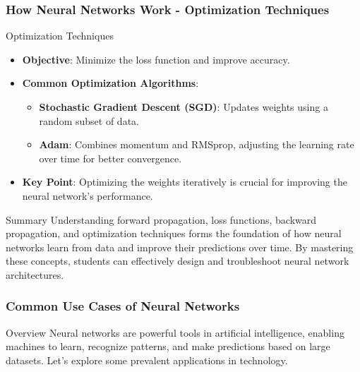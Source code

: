\documentclass[aspectratio=169]{beamer}
\begin{document}
\begin{frame}[fragile]
    \frametitle{How Neural Networks Work - Optimization Techniques}
    \begin{block}{Optimization Techniques}
        \begin{itemize}
            \item \textbf{Objective}: Minimize the loss function and improve accuracy.
            
            \item \textbf{Common Optimization Algorithms}:
            \begin{itemize}
                \item \textbf{Stochastic Gradient Descent (SGD)}: Updates weights using a random subset of data.
                \item \textbf{Adam}: Combines momentum and RMSprop, adjusting the learning rate over time for better convergence.
            \end{itemize}
            
            \item \textbf{Key Point}: Optimizing the weights iteratively is crucial for improving the neural network's performance.
        \end{itemize}
    \end{block}

    \begin{block}{Summary}
        Understanding forward propagation, loss functions, backward propagation, and optimization techniques forms the foundation of how neural networks learn from data and improve their predictions over time. By mastering these concepts, students can effectively design and troubleshoot neural network architectures.
    \end{block}
\end{frame}

\begin{frame}
  \frametitle{Common Use Cases of Neural Networks}
  \begin{block}{Overview}
    Neural networks are powerful tools in artificial intelligence, enabling machines to learn, recognize patterns, and make predictions based on large datasets. 
    Let's explore some prevalent applications in technology.
  \end{block}
\end{frame}
\end{document}
